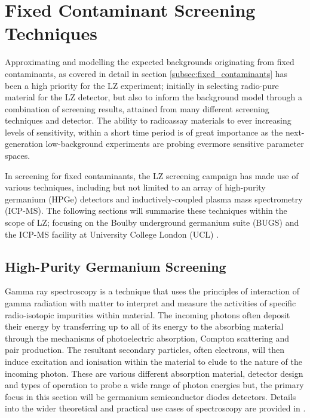 \section{Fixed Contaminant Screening Techniques}
\label{sec:fixed_contaminant_screening}

Approximating and modelling the expected backgrounds originating from fixed contaminants, as covered in detail in section \ref{subsec:fixed_contaminants} has been a high priority for the LZ experiment; initially in selecting radio-pure material for the LZ detector, but also to inform the background model through a combination of screening results, attained from many different screening techniques and detector. The ability to radioassay materials to ever increasing levels of sensitivity, within a short time period is of great importance as the next-generation low-background experiments are probing evermore sensitive parameter spaces. 

In screening for fixed contaminants, the LZ screening campaign has made use of various techniques, including but not limited to an array of high-purity germanium (HPGe) detectors and inductively-coupled plasma mass spectrometry (ICP-MS). The following sections will summarise these techniques within the scope of LZ; focusing on the Boulby underground germanium suite (BUGS) \cite{bugs_boulby} and the ICP-MS facility at University College London (UCL) \cite{icpms_ucl}. 


\subsection{High-Purity Germanium Screening}
\label{subsec:HPGe}

Gamma ray spectroscopy is a technique that uses the principles of interaction of gamma radiation with matter to interpret and measure the activities of specific radio-isotopic impurities within material. The incoming \gray{} photons often deposit their energy by transferring up to all of its energy to the absorbing material through the mechanisms of photoelectric absorption, Compton scattering and pair production. The resultant secondary particles, often electrons, will then induce excitation and ionisation within the material to elude to the nature of the incoming photon. These are various different absorption material, detector design and types of operation to probe a wide range of photon energies but, the primary focus in this section will be germanium semiconductor diodes detectors. Details into the wider theoretical and practical use cases of \gray{} spectroscopy are provided in \cite{gilmore2011practical}.

